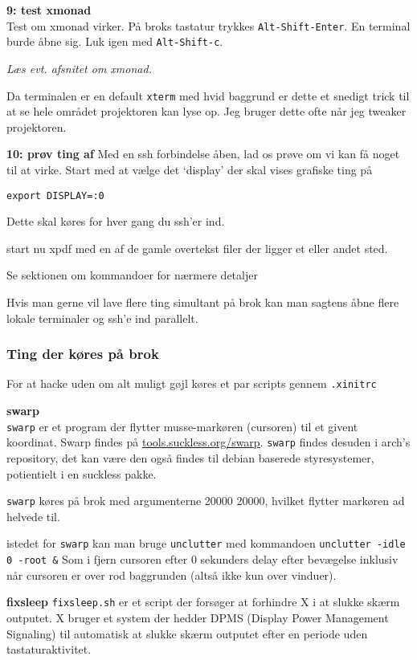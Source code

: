 \documentclass[10pt,a4paper,danish]{article}
\newcommand{\code}[1]{\colorbox{verbgray}{\texttt{#1}}}
\begin{document}
\textbf{9: test xmonad}\\
Test om xmonad virker. På broks tastatur trykkes \texttt{Alt-Shift-Enter}.
En terminal burde åbne sig.
Luk igen med \texttt{Alt-Shift-c}.

\textit{Læs evt. afsnitet om xmonad.}

Da terminalen er en default \texttt{xterm} med hvid baggrund er dette et snedigt trick
til at se hele området projektoren kan lyse op.
Jeg bruger dette ofte når jeg tweaker projektoren.



\textbf{10: prøv ting af}
Med en ssh forbindelse åben, lad os prøve om vi kan få noget til at virke.
Start med at vælge det `display' der skal vises grafiske ting på
\begin{verbatim}
export DISPLAY=:0
\end{verbatim}
Dette skal køres for hver gang du ssh'er ind.

start nu xpdf med en af de gamle overtekst filer der ligger et eller andet sted.

Se sektionen om kommandoer for nærmere detaljer

Hvis man gerne vil lave flere ting simultant på brok kan man sagtens åbne flere
lokale terminaler og ssh'e ind parallelt.




\subsubsection{Ting der køres på brok}
For at hacke uden om alt muligt gøjl køres et par scripts gennem
\texttt{.xinitrc}

\textbf{swarp}\\
\texttt{swarp} er et program der flytter musse-markøren (cursoren) til et givent koordinat.
Swarp findes på \url{tools.suckless.org/swarp}.
\texttt{swarp} findes desuden i arch's repository, det kan være den også findes til
debian baserede styresystemer, potientielt i en suckless pakke.

\texttt{swarp} køres på brok med argumenterne 20000 20000, hvilket flytter
markøren ad helvede til.

istedet for \texttt{swarp} kan man bruge \texttt{unclutter}
med kommandoen \code{unclutter -idle 0 -root \&}
Som i fjern cursoren efter 0 sekunders delay efter bevægelse inklusiv når
cursoren er over rod baggrunden (altså ikke kun over vinduer).

\textbf{fixsleep}
\texttt{fixsleep.sh} er et script der forsøger at forhindre X i at slukke skærm outputet.
X bruger et system der hedder DPMS (Display Power Management Signaling) til
automatisk at slukke skærm outputet efter en periode uden tastaturaktivitet.
\end{document}
